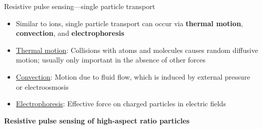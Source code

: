 \begin{frame}[c]{Resistive pulse sensing---single particle transport}
	\begin{itemize}
		\item Similar to ions, single particle transport can occur via \textbf{thermal motion}, \textbf{convection}, and \textbf{electrophoresis}
		\item \underline{Thermal motion}: Collisions with atoms and molecules causes random diffusive motion; usually only important in the absence of other forces 
		\item \underline{Convection}: Motion due to fluid flow, which is induced by external pressure or electroosmosis
		\item \underline{Electrophoresis}: Effective force on charged particles in electric fields
	\end{itemize}
	
	

\end{frame}





\begin{frame}[c]{}
	\begin{center}
		\textbf{Resistive pulse sensing of high-aspect ratio particles}
	\end{center}
\end{frame}






